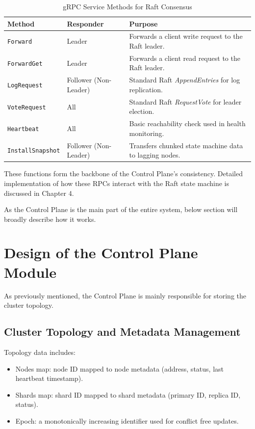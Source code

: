\documentclass[shortabstract]{iithesis}
\begin{document}
\begin{table}[h!]
\centering
\caption{gRPC Service Methods for Raft Consensus}
\label{tab:grpc_methods}
\begin{tabularx}{\textwidth}{|l|l|X|}
\hline
\textbf{Method} & \textbf{Responder} & \textbf{Purpose} \\ \hline
\texttt{Forward} & Leader & Forwards a client write request to the Raft leader. \\ \hline
\texttt{ForwardGet} & Leader & Forwards a client read request to the Raft leader. \\ \hline
\texttt{LogRequest} & Follower (Non-Leader) & Standard Raft \textit{AppendEntries} for log replication. \\ \hline
\texttt{VoteRequest} & All & Standard Raft \textit{RequestVote} for leader election. \\ \hline
\texttt{Heartbeat} & All & Basic reachability check used in health monitoring. \\ \hline
\texttt{InstallSnapshot} & Follower (Non-Leader) & Transfers chunked state machine data to lagging nodes. \\ \hline
\end{tabularx}
\end{table}

These functions form the backbone of the Control Plane's consistency. Detailed implementation of how these RPCs interact with the Raft state machine is discussed in Chapter 4.

As the Control Plane is the main part of the entire system, below section will broadly describe how it works.

\section{Design of the Control Plane Module}
As previously mentioned, the Control Plane is mainly responsible for storing the cluster topology.

\subsection{Cluster Topology and Metadata Management}
Topology data includes:
\begin{itemize}
    \item Nodes map: node ID mapped to node metadata (address, status, last heartbeat timestamp).
    \item Shards map: shard ID mapped to shard metadata (primary ID, replica ID, status).
    \item Epoch: a monotonically increasing identifier used for conflict free updates.
\end{itemize}
\end{document}
